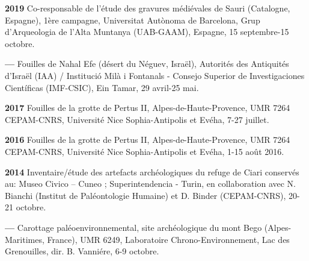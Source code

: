 \documentclass{article}
\newcommand{\fr}[1]{#1}       %
\newcommand{\en}[1]{}     %
\begin{document}
\smallbreak
\textbf{2019}
\fr{Co-responsable de l'étude des gravures médiévales de Sauri (Catalogne, Espagne), 1ère campagne, Universitat Autònoma de Barcelona, Grup d'Arqueologia de l'Alta Muntanya (UAB-GAAM), Espagne, 15 septembre-15 octobre.}
\en{Co-director of the study of medieval engravings at Sauri (Catalonia, Spain), 1st campaign, Autonomous University of Barcelona, High Mountain Archaeology Group (UAB-GAAM), Spain, September 15 - October 15.}

\smallbreak
\textbf{--- }
\fr{Fouilles de Nahal Efe (désert du Néguev, Israël), Autorités des Antiquités d'Israël (IAA) / Institució Milà i Fontanals - Consejo Superior de Investigaciones Científicas (IMF-CSIC), Ein Tamar, 29 avril-25 mai.}
\en{Excavations at Nahal Efe (Negev Desert, Israel), Israel Antiquities Authority (IAA) / Institució Milà i Fontanals - Spanish National Research Council (IMF-CSIC), Ein Tamar, April 29 - May 25.}

\smallbreak
\textbf{2017}
\fr{Fouilles de la grotte de Pertus II, Alpes-de-Haute-Provence, UMR 7264 CEPAM-CNRS, Université Nice Sophia-Antipolis et Evéha, 7-27 juillet.}
\en{Excavations at the Pertus II cave, Alpes-de-Haute-Provence, UMR 7264 CEPAM-CNRS, University of Nice Sophia-Antipolis and Evéha, July 7-27.}

\smallbreak
\textbf{2016}
\fr{Fouilles de la grotte de Pertus II, Alpes-de-Haute-Provence, UMR 7264 CEPAM-CNRS, Université Nice Sophia-Antipolis et Evéha, 1-15 août 2016.}
\en{Excavations at the Pertus II cave, Alpes-de-Haute-Provence, UMR 7264 CEPAM-CNRS, University of Nice Sophia-Antipolis and Evéha, August 1-15, 2016.}

\smallbreak
\textbf{2014}
\fr{Inventaire/étude des artefacts archéologiques du refuge de Ciari conservés au: Museo Civico -- Cuneo ; Superintendencia - Turin, en collaboration avec N. Bianchi (Institut de Paléontologie Humaine) et D. Binder (CEPAM-CNRS), 20-21 octobre.}
\en{Inventory/study of archaeological artifacts from the Ciari refuge stored at: Museo Civico -- Cuneo; Superintendencia - Turin, in collaboration with N. Bianchi (Institute of Human Paleontology) and D. Binder (CEPAM-CNRS), October 20-21.}

\smallbreak
\textbf{--- }
\fr{Carottage paléoenvironnemental, site archéologique du mont Bego (Alpes-Maritimes, France), UMR 6249, Laboratoire Chrono-Environnement, Lac des Grenouilles, dir. B. Vanniére, 6-9 octobre.}
\en{Paleoenvironmental coring, archaeological site of Mont Bego (Alpes-Maritimes, France), UMR 6249, Laboratory of Chrono-Environment, Lac des Grenouilles, directed by B. Vanniére, October 6-9.}
\end{document}
